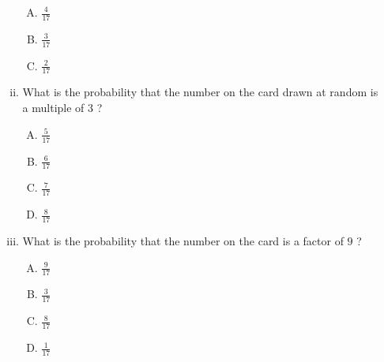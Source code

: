 \documentclass{article}
\begin{document}
\begin{enumerate}
\begin{enumerate}[(i)]
\begin{enumerate}[(A)]
             \item $\frac{4}{17}$
             \item $\frac{3}{17}$
             \item $\frac{2}{17}$
        \end{enumerate}
        \item What is the probability that the number on the card drawn at random is a multiple of $3$ ?
         \begin{enumerate}[(A)]
             \item $\frac{5}{17}$
             \item $\frac{6}{17}$
             \item $\frac{7}{17}$
             \item $\frac{8}{17}$
        \end{enumerate}
        \item What is the probability that the number on the card is a factor of $9$ ?
          \begin{enumerate}[(A)]
             \item $\frac{9}{17}$
             \item $\frac{3}{17}$
             \item $\frac{8}{17}$
             \item $\frac{1}{17}$
        \end{enumerate}
    \end{enumerate}
\end{enumerate}
\end{document}
